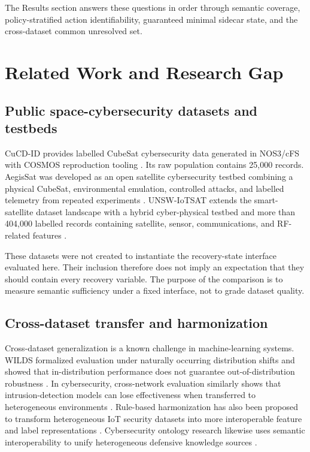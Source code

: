 \documentclass[preprint,12pt]{elsarticle}
\begin{document}
The Results section answers these questions in order through semantic coverage, policy-stratified action identifiability, guaranteed minimal sidecar state, and the cross-dataset common unresolved set.

\section{Related Work and Research Gap}

\subsection{Public space-cybersecurity datasets and testbeds}

CuCD-ID provides labelled CubeSat cybersecurity data generated in NOS3/cFS with COSMOS reproduction tooling \cite{fayyaz2026cucd}. Its raw population contains 25,000 records. AegisSat was developed as an open satellite cybersecurity testbed combining a physical CubeSat, environmental emulation, controlled attacks, and labelled telemetry from repeated experiments \cite{idan2025aegissat}. UNSW-IoTSAT extends the smart-satellite dataset landscape with a hybrid cyber-physical testbed and more than 404,000 labelled records containing satellite, sensor, communications, and RF-related features \cite{abdelhameed2026unsw}.

These datasets were not created to instantiate the recovery-state interface evaluated here. Their inclusion therefore does not imply an expectation that they should contain every recovery variable. The purpose of the comparison is to measure semantic sufficiency under a fixed interface, not to grade dataset quality.

\subsection{Cross-dataset transfer and harmonization}

Cross-dataset generalization is a known challenge in machine-learning systems. WILDS formalized evaluation under naturally occurring distribution shifts and showed that in-distribution performance does not guarantee out-of-distribution robustness \cite{koh2021wilds}. In cybersecurity, cross-network evaluation similarly shows that intrusion-detection models can lose effectiveness when transferred to heterogeneous environments \cite{cerasuolo2026transfer}. Rule-based harmonization has also been proposed to transform heterogeneous IoT security datasets into more interoperable feature and label representations \cite{rodriguez2026harmonization}. Cybersecurity ontology research likewise uses semantic interoperability to unify heterogeneous defensive knowledge sources \cite{akbar2023ontology}.
\end{document}
